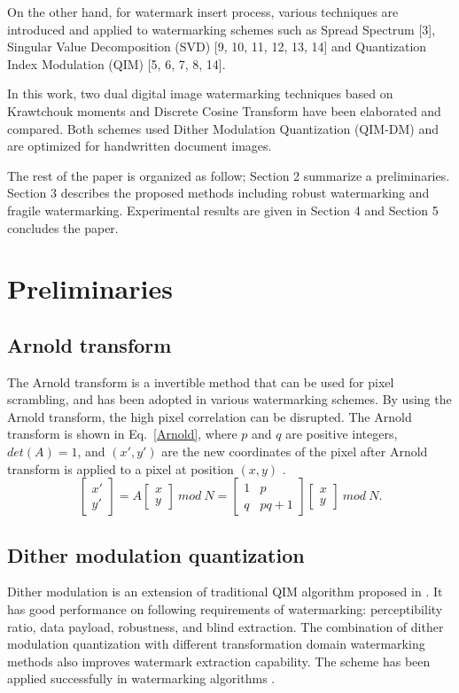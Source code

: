 \documentclass[runningheads]{llncs}
\begin{document}
On the other hand, for watermark insert process, various techniques are introduced and applied to watermarking schemes such as Spread Spectrum [3], Singular Value Decomposition (SVD) [9, 10, 11, 12, 13, 14] and Quantization Index Modulation (QIM) [5, 6, 7, 8, 14].

In this work, two dual digital image watermarking techniques based on Krawtchouk moments and Discrete Cosine Transform have been elaborated and compared. Both schemes used Dither Modulation Quantization (QIM-DM) and are optimized for handwritten document images. 

The rest of the paper is organized as follow; Section 2 summarize a preliminaries. Section 3 describes the proposed methods including robust watermarking and fragile watermarking. Experimental results are given in Section 4 and Section 5 concludes the paper.

\section{Preliminaries}
\subsection{Arnold transform}
The Arnold transform is a invertible method that can be used for pixel scrambling, and has been adopted in various watermarking schemes. By using the Arnold transform, the high pixel correlation can be disrupted. The Arnold transform is shown in Eq.~\ref{Arnold}, where $p$ and $q$ are positive integers, $det(A) = 1$, and $(x', y')$ are the new coordinates of the pixel after Arnold transform is applied to a pixel at position $(x, y)$ \cite{Chow2017}.
\begin{equation}
\left[\begin{array}{c}x'\\y'\end{array}\right]=A\left[\begin{array}{c}x\\y\end{array}\right]\ mod\ N=\left[\begin{array}{cc}1 & p\\q & pq+1\end{array}\right]\left[\begin{array}{c}x\\y\end{array}\right]\ mod\ N.
\label{Arnold}
\end{equation}

\subsection{Dither modulation quantization}
Dither modulation is an extension of traditional QIM algorithm proposed in \cite{chen2001quantization}. It has good performance on following requirements of watermarking: perceptibility ratio, data payload, robustness, and blind extraction. The combination of dither modulation quantization with different transformation domain watermarking methods also improves watermark extraction capability. The scheme has been applied successfully in watermarking algorithms \cite{avila2018watermarking,deng2009local,papakostas2014moment,zhu2016optimal}.
\end{document}
